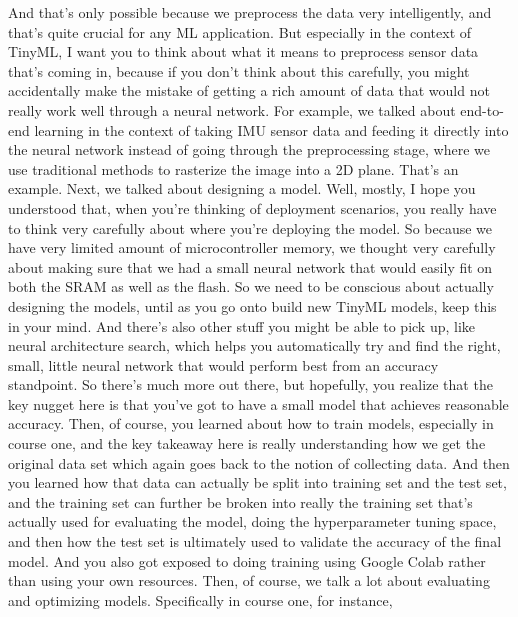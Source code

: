     And that's only possible because we preprocess the data very intelligently,
    and that's quite crucial for any ML application.
    But especially in the context of TinyML, I
    want you to think about what it means to preprocess sensor data that's
    coming in, because if you don't think about this carefully,
    you might accidentally make the mistake of getting
    a rich amount of data that would not really
    work well through a neural network.
    For example, we talked about end-to-end learning
    in the context of taking IMU sensor data and feeding it directly
    into the neural network instead of going through the preprocessing stage, where
    we use traditional methods to rasterize the image into a 2D plane.
    That's an example.
    Next, we talked about designing a model.
    Well, mostly, I hope you understood that, when
    you're thinking of deployment scenarios, you really
    have to think very carefully about where you're deploying the model.
    So because we have very limited amount of microcontroller memory,
    we thought very carefully about making sure
    that we had a small neural network that would easily fit
    on both the SRAM as well as the flash.
    So we need to be conscious about actually designing the models,
    until as you go onto build new TinyML models, keep this in your mind.
    And there's also other stuff you might be
    able to pick up, like neural architecture search, which
    helps you automatically try and find the right, small, little neural network
    that would perform best from an accuracy standpoint.
    So there's much more out there, but hopefully, you
    realize that the key nugget here is that you've
    got to have a small model that achieves reasonable accuracy.
    Then, of course, you learned about how to train models, especially
    in course one, and the key takeaway here is really
    understanding how we get the original data set which again goes back
    to the notion of collecting data.
    And then you learned how that data can actually
    be split into training set and the test set,
    and the training set can further be broken into really the training set
    that's actually used for evaluating the model,
    doing the hyperparameter tuning space, and then
    how the test set is ultimately used to validate
    the accuracy of the final model.
    And you also got exposed to doing training using Google Colab
    rather than using your own resources.
    Then, of course, we talk a lot about evaluating and optimizing models.
    Specifically in course one, for instance,
